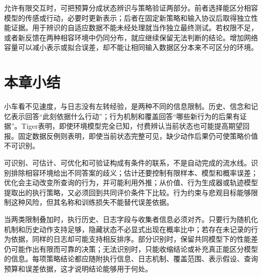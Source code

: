 允许有限交互时，可把预算分成状态辨识与策略验证两部分。前者选择能区分相容模型的传感或行动，必要时更新表示；后者在固定新策略和输入协议后取得独立性能证据。用于辨识的自适应数据不能未经处理就当作独立最终测试。若权限不足，或者新反馈在两种相容环境中仍同分布，就应继续保留无法判断的结论。增加网络容量可以减小表示或拟合误差，却不能让相同输入数据区分本来不可区分的环境。

\section{本章小结}
\label{sec:rl-information-summary}

小车看不见速度，与日志没有左转经验，是两种不同的信息限制。历史、信念和记忆表示回答“此刻依据什么行动”；行为机制和覆盖回答“哪些新行为的后果有证据”。Tiger表明，即使环境模型完全已知，付费辨认当前状态也可能提高期望回报。固定数据反例则表明，即使当前状态完整可见，缺少动作后果仍可使策略价值不可识别。

可识别、可估计、可优化和可验证构成有条件的联系，不是自动完成的流水线。识别排除相容环境给出不同答案的歧义；估计还要控制有限样本、模型和概率误差；优化会主动改变所查询的行为，并可能利用外推；从价值、行为生成器或轨迹模型提取出的执行策略，又必须回到共同评价条件下比较。行为约束与悲观目标能够限制这种风险，但其名称和训练损失不能替代误差依据。

当两类限制叠加时，执行历史、日志字段与收集者信息必须对齐。只要行为随机化机制和历史动作支持足够，隐藏状态不必显式出现在概率比中；若存在未记录的行为依据，同样的日志却可能支持相反排序。部分识别时，保留共同模型下的性能差仍可能作出有限而可靠的决策；无法识别时，只能收缩结论或补充真正能区分模型的信息。每项策略结论都应随附执行信息、日志机制、覆盖范围、表示假设、查询预算和误差依据，这才说明结论能够用于何处。

